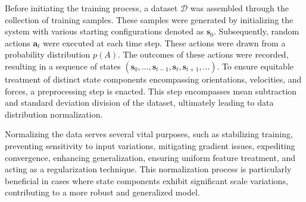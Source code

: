 Before initiating the training process, a dataset $\mathcal{D}$ was assembled through the collection of training samples. These samples were generated by initializing the system with various starting configurations denoted as $\mathbf{s}_0$. Subsequently, random actions $\mathbf{a}_t$ were executed at each time step. These actions were drawn from a probability distribution $p(A)$. The outcomes of these actions were recorded, resulting in a sequence of states $(\mathbf{s}_0, ..., \mathbf{s}_{t-1}, \mathbf{s}_t, \mathbf{s}_{t+1}, ...)$. To ensure equitable treatment of distinct state components encompassing orientations, velocities, and forces, a preprocessing step is enacted. This step encompasses mean subtraction and standard deviation division of the dataset, ultimately leading to data distribution normalization. 

Normalizing the data serves several vital purposes, such as stabilizing training, preventing sensitivity to input variations, mitigating gradient issues, expediting convergence, enhancing generalization, ensuring uniform feature treatment, and acting as a regularization technique. This normalization process is particularly beneficial in cases where state components exhibit significant scale variations, contributing to a more robust and generalized model.

